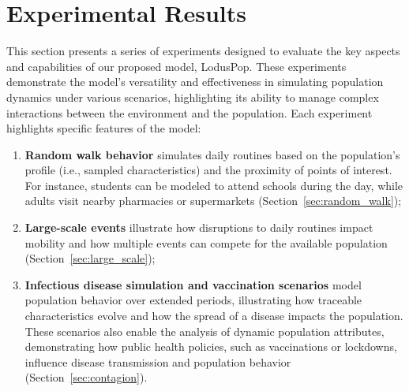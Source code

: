 \documentclass[pdflatex,sn-mathphys-num]{sn-jnl}%
\newcommand\redb[1]{#1}
\theoremstyle{thmstyleone}%
\theoremstyle{thmstyletwo}%
\theoremstyle{thmstylethree}%
\begin{document}

\section{Experimental Results}
\label{sec:results}


This section presents a series of experiments designed to evaluate the key aspects and capabilities of our proposed model, LodusPop. These experiments demonstrate the model's versatility and effectiveness in simulating population dynamics under various scenarios, highlighting its ability to manage complex interactions between the environment and the population. Each experiment highlights specific features of the model:
\begin{enumerate}
    \item \textbf{Random walk behavior} simulates daily routines based on the population's profile (i.e., sampled characteristics) and the proximity of points of interest. For instance, students can be modeled to attend schools during the day, while adults visit nearby pharmacies or supermarkets (Section~\ref{sec:random_walk});
    \item \textbf{Large-scale events} illustrate how disruptions to daily routines impact mobility and how multiple events can compete for the available population  (Section~\ref{sec:large_scale});
    \item \textbf{Infectious disease simulation and vaccination scenarios} model population behavior over extended periods, illustrating how traceable characteristics evolve and how the spread of a disease impacts the population. These scenarios also enable the analysis of dynamic population attributes, demonstrating how public health policies, such as vaccinations or lockdowns, influence disease transmission and population behavior (Section~\ref{sec:contagion}).
\end{enumerate}
\end{document}
